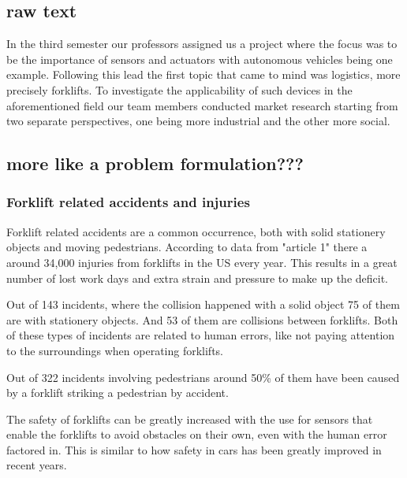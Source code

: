 \documentclass[11pt]{article}
\begin{document}
    \subsection{raw text}
    In the third semester our professors assigned us a project where
    the focus was to be the importance of sensors and actuators with
    autonomous vehicles being one example. Following this lead the first
    topic that came to mind was logistics, more precisely forklifts.
    To investigate the applicability of such devices in the 
    aforementioned field our team members conducted market research 
    starting from two separate perspectives, one being more 
    industrial and the other more social.

    \subsection{more like a problem formulation???}
    \subsubsection{Forklift related accidents and injuries}
    Forklift related accidents are a common occurrence, both with solid
    stationery objects and moving pedestrians. According to data from "article
    1" there a around 34,000 injuries from forklifts in the US every year. This
    results in a great number of lost work days and extra strain and 
    pressure to make up the deficit.

    Out of 143 incidents, where the collision happened with a solid object
    75 of them are with stationery objects. And 53 of them are collisions 
    between forklifts. Both of these types of incidents are related to 
    human errors, like not paying attention to the surroundings when 
    operating forklifts.

    Out of 322 incidents involving pedestrians around 50\% of them have 
    been caused by a forklift striking a pedestrian by accident.

    The safety of forklifts can be greatly increased with the use for sensors that
    enable the forklifts to avoid obstacles on their own, even with the human 
    error factored in. This is similar to how safety in cars has been greatly
    improved in recent years.
\end{document}
